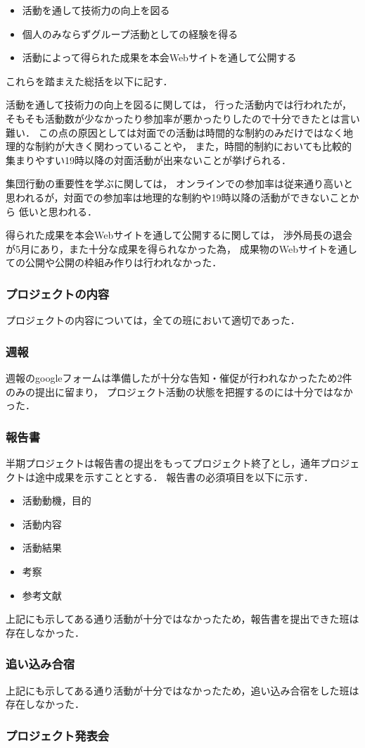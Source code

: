 \begin{itemize}
  \item 活動を通して技術力の向上を図る
  \item 個人のみならずグループ活動としての経験を得る
  \item 活動によって得られた成果を本会Webサイトを通して公開する
\end{itemize}

これらを踏まえた総括を以下に記す．

活動を通して技術力の向上を図るに関しては，
行った活動内では行われたが，そもそも活動数が少なかったり参加率が悪かったりしたので十分できたとは言い難い．
この点の原因としては対面での活動は時間的な制約のみだけではなく地理的な制約が大きく関わっていることや，
また，時間的制約においても比較的集まりやすい19時以降の対面活動が出来ないことが挙げられる．

集団行動の重要性を学ぶに関しては，
オンラインでの参加率は従来通り高いと思われるが，対面での参加率は地理的な制約や19時以降の活動ができないことから
低いと思われる．

得られた成果を本会Webサイトを通して公開するに関しては，
渉外局長の退会が5月にあり，また十分な成果を得られなかった為，
成果物のWebサイトを通しての公開や公開の枠組み作りは行われなかった．

\subsubsection*{プロジェクトの内容}
プロジェクトの内容については，全ての班において適切であった．

\subsubsection*{週報}
週報のgoogleフォームは準備したが十分な告知・催促が行われなかったため2件のみの提出に留まり，
プロジェクト活動の状態を把握するのには十分ではなかった．

\subsubsection*{報告書}
半期プロジェクトは報告書の提出をもってプロジェクト終了とし，通年プロジェクトは途中成果を示すこととする．
報告書の必須項目を以下に示す．

\begin{itemize}
  \item 活動動機，目的
  \item 活動内容
  \item 活動結果
  \item 考察
  \item 参考文献
\end{itemize}

上記にも示してある通り活動が十分ではなかったため，報告書を提出できた班は存在しなかった．

\subsubsection*{追い込み合宿}
上記にも示してある通り活動が十分ではなかったため，追い込み合宿をした班は存在しなかった．


\subsubsection*{プロジェクト発表会}


